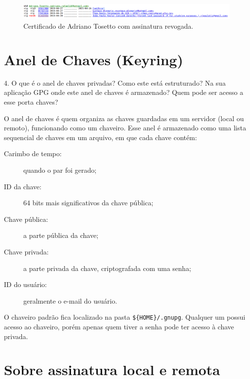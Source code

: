 \documentclass{article}
\begin{document}
    \begin{figure}[h]
        \centering
        \includegraphics[keepaspectratio,width=1\textwidth]{tosetto-revoked-sig}
        \caption{%
            Certificado de Adriano Tosetto com assinatura
            revogada.\label{fig:revokeed-sign}
        }
    \end{figure}

    \section{Anel de Chaves (Keyring)}

    \begin{superframe}
        4. O que é o anel de chaves privadas? Como este está estruturado? Na
        sua aplicação GPG onde este anel de chaves é armazenado? Quem pode ser
        acesso a esse porta chaves?
    \end{superframe}

    O anel de chaves é quem organiza as chaves guardadas em um servidor (local
    ou remoto), funcionando como um chaveiro. Esse anel é armazenado como uma
    lista sequencial de chaves em um arquivo, em que cada chave contém:

    \begin{description}
        \item[Carimbo de tempo:] quando o par foi gerado;
        \item[ID da chave:] 64 bits mais significativos da chave pública;
        \item[Chave pública:] a parte pública da chave;
        \item[Chave privada:] a parte privada da chave, criptografada com uma senha;
        \item[ID do usuário:] geralmente o e-mail do usuário.
    \end{description}

    O chaveiro padrão fica localizado na pasta \texttt{\$\{HOME\}/.gnupg}.
    Qualquer um possui acesso ao chaveiro, porém apenas quem tiver a senha pode
    ter acesso à chave privada.

    \section{Sobre assinatura local e remota}
\end{document}
